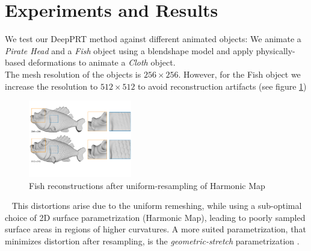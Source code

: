 \section{Experiments and Results}  \label{Sec:Experiments}
We test our DeepPRT method against different animated objects: We animate a \textit{Pirate Head} and a \textit{Fish} object using a blendshape model and apply physically-based deformations to animate a \textit{Cloth} object.
\\
The mesh resolution of the objects is $256 \times 256$. However, for the Fish object we increase the resolution to $512 \times 512$ to avoid reconstruction artifacts (see figure \ref{Fig: Fish Reconstruction})
\begin{figure}[H]
  \centering
    \includegraphics[width=0.4\textwidth]{Figures/fish}
     \caption{Fish reconstructions after uniform-resampling of Harmonic Map}
     \label{Fig: Fish Reconstruction}
\end{figure}~
This distortions arise due to the uniform remeshing, while using a sub-optimal choice of 2D surface parametrization (Harmonic Map), leading to poorly sampled surface areas in regions of higher curvatures. A more suited parametrization, that minimizes distortion after resampling, is the \textit{geometric-stretch} parametrization  \cite{gu2002geometry}.
